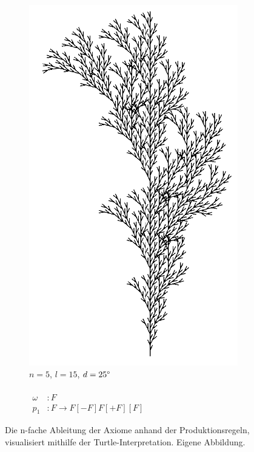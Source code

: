 \begin{figure} [hbtp]
\begin{subfigure}[t]{.4\textwidth}
		\includegraphics[width=\linewidth]{images/Branching2_N5L15D25.png}
		\caption{$n=5$, $l=15$, $d=25\degree$\\ \\
			$\begin{array}{ll}
				\omega & : F \\
				p_1 & : F \rightarrow F[-F]F[+F][F]
			\end{array}
			\label{eq:ProdBranching2}$\\
			\cite[S.78]{PCGiG:16}
		}
		\label{fig:Branching2L15D25}
	\end{subfigure}

	\caption{Die n-fache Ableitung der Axiome anhand der Produktionsregeln, visualisiert mithilfe der Turtle-Interpretation. Eigene Abbildung.}
	\label{fig:BranchingLSystems}
\end{figure}

